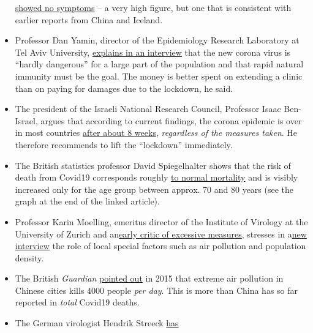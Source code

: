 \begin{itemize}
  \href{https://www.nejm.org/doi/full/10.1056/NEJMc2009316}{showed no
  symptoms} -- a very high figure, but one that is consistent with
  earlier reports from China and Iceland.
\item
  Professor Dan Yamin, director of the Epidemiology Research Laboratory
  at Tel Aviv University,
  \href{https://www.ynet.co.il/articles/0,7340,L-5714371,00.html}{explains
  in an interview} that the new corona virus is ``hardly dangerous'' for
  a large part of the population and that rapid natural immunity must be
  the goal. The money is better spent on extending a clinic than on
  paying for damages due to the lockdown, he said.
\item
  The president of the Israeli National Research Council, Professor
  Isaac Ben-Israel, argues that according to current findings, the
  corona epidemic is over in most countries
  \href{https://www.timesofisrael.com/top-israeli-prof-claims-simple-stats-show-virus-plays-itself-out-after-70-days/}{after
  about 8 weeks}, \emph{regardless of the measures taken}. He therefore
  recommends to lift the ``lockdown'' immediately.
\item
  The British statistics professor David Spiegelhalter shows that the
  risk of death from Covid19 corresponds roughly
  \href{https://medium.com/wintoncentre/how-much-normal-risk-does-covid-represent-4539118e1196}{to
  normal mortality} and is visibly increased only for the age group
  between approx. 70 and 80 years (see the graph at the end of the
  linked article).
\item
  Professor Karin Moelling, emeritus director of the Institute of
  Virology at the University of Zurich and
  an\href{https://www.rubikon.news/artikel/die-stimme-der-vernunft}{early
  critic of excessive measures}, stresses in
  a\href{https://www.youtube.com/watch?v=4rl2sqLcDoQ}{new interview} the
  role of local special factors such as air pollution and population
  density.
\item
  The British \emph{Guardian}
  \href{https://www.theguardian.com/world/2015/aug/14/air-pollution-in-china-is-killing-4000-people-every-day-a-new-study-finds}{pointed
  out} in 2015 that extreme air pollution in Chinese cities kills 4000
  people \emph{per day}. This is more than China has so far reported in
  \emph{total} Covid19 deaths.
\item
  The German virologist Hendrik Streeck
  \href{https://www.tagesspiegel.de/wissen/virologe-streeck-zur-coronavirus-studie-die-veroeffentlichung-zu-heinsberg-war-nicht-leichtfertig/25735672.html}{has
}
\end{itemize}
